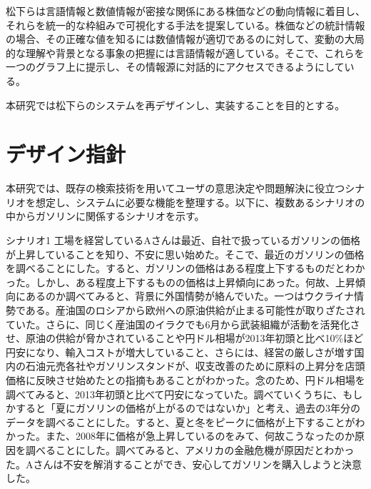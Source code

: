 \documentclass{matsushita-zemi}
\begin{document}
松下らは言語情報と数値情報が密接な関係にある株価などの動向情報に着目し、それらを統一的な枠組みで可視化する手法を提案している\cite{Elucignage-jsai}\cite{Elucignage}。株価などの統計情報の場合、その正確な値を知るには数値情報が適切であるのに対して、変動の大局的な理解や背景となる事象の把握には言語情報が適している。そこで、これらを一つのグラフ上に提示し、その情報源に対話的にアクセスできるようにしている。

本研究では松下らのシステムを再デザインし、実装することを目的とする。

\section{デザイン指針}
本研究では、既存の検索技術を用いてユーザの意思決定や問題解決に役立つシナリオを想定し、システムに必要な機能を整理する。以下に、複数あるシナリオの中からガソリンに関係するシナリオを示す。
\begin{itembox}[l]{シナリオ1}
工場を経営しているAさんは最近、自社で扱っているガソリンの価格が上昇していることを知り、不安に思い始めた。そこで、最近のガソリンの価格を調べることにした。すると、ガソリンの価格はある程度上下するものだとわかった。しかし、ある程度上下するものの価格は上昇傾向にあった。何故、上昇傾向にあるのか調べてみると、背景に外国情勢が絡んでいた。一つはウクライナ情勢である。産油国のロシアから欧州への原油供給が止まる可能性が取りざたされていた。さらに、同じく産油国のイラクでも6月から武装組織が活動を活発化させ、原油の供給が脅かされていることや円ドル相場が2013年初頭と比べ10\%ほど円安になり、輸入コストが増大していること、さらには、経営の厳しさが増す国内の石油元売各社やガソリンスタンドが、収支改善のために原料の上昇分を店頭価格に反映させ始めたとの指摘もあることがわかった。念のため、円ドル相場を調べてみると、2013年初頭と比べて円安になっていた。調べていくうちに、もしかすると「夏にガソリンの価格が上がるのではないか」と考え、過去の3年分のデータを調べることにした。すると、夏と冬をピークに価格が上下することがわかった。また、2008年に価格が急上昇しているのをみて、何故こうなったのか原因を調べることにした。調べてみると、アメリカの金融危機が原因だとわかった。Aさんは不安を解消することができ、安心してガソリンを購入しようと決意した。
\end{itembox}
\end{document}
